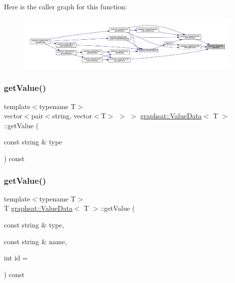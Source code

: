 Here is the caller graph for this function\+:
\nopagebreak
\begin{figure}[H]
\begin{center}
\leavevmode
\includegraphics[width=350pt]{classgraphsat_1_1_value_data_a393f4c36450ba089b2b19a39f1094bf3_icgraph}
\end{center}
\end{figure}
\mbox{\label{classgraphsat_1_1_value_data_a7214b99af7ad307d0f253a6440d451b3}} 
\subsubsection{\texorpdfstring{getValue()}{getValue()}\hspace{0.1cm}{\footnotesize\ttfamily [2/3]}}
{\footnotesize\ttfamily template$<$typename T$>$ \\
vector$<$pair$<$string, vector$<$T$>$ $>$ $>$ \mbox{\hyperlink{classgraphsat_1_1_value_data}{graphsat\+::\+Value\+Data}}$<$ T $>$\+::get\+Value (\begin{DoxyParamCaption}\item[{const string \&}]{type }\end{DoxyParamCaption}) const\hspace{0.3cm}{\ttfamily [inline]}}

\mbox{\label{classgraphsat_1_1_value_data_a072e3aefea03ed89f7dc2b656d4dc62c}} 
\subsubsection{\texorpdfstring{getValue()}{getValue()}\hspace{0.1cm}{\footnotesize\ttfamily [3/3]}}
{\footnotesize\ttfamily template$<$typename T$>$ \\
T \mbox{\hyperlink{classgraphsat_1_1_value_data}{graphsat\+::\+Value\+Data}}$<$ T $>$\+::get\+Value (\begin{DoxyParamCaption}\item[{const string \&}]{type,  }\item[{const string \&}]{name,  }\item[{int}]{id = {} }\end{DoxyParamCaption}) const\hspace{0.3cm}{\ttfamily [inline]}}

